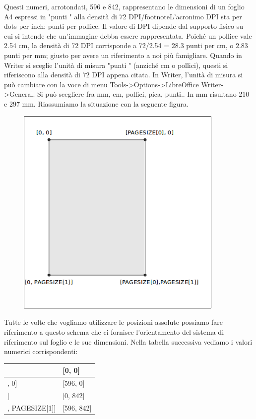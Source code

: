 Questi numeri, arrotondati, 596 e 842, rappresentano le dimensioni di un foglio A4 espressi in  "punti " alla densità di 72 DPI/footnote{L'acronimo DPI sta per dots per inch: punti per pollice. Il valore di DPI dipende dal supporto fisico su cui si intende che un'immagine debba essere rappresentata. Poiché un pollice vale 2.54 cm, la densità di 72 DPI corrisponde a 72/2.54 = 28.3 punti per cm, o 2.83 punti per mm; giusto per avere un riferimento a noi più famigliare. Quando in Writer si sceglie l'unità di misura  "punti " (anziché cm o pollici), questi si riferiscono alla densità di 72 DPI appena citata. In Writer, l'unità di misura si può cambiare con la voce di menu Tools->Options->LibreOffice Writer->General. Si può scegliere fra mm, cm, pollici, pica, punti.}. In mm risultano 210 e 297 mm. Riassumiamo la situazione con la seguente figura.

\vskip 1cm

\begin{figure}[H]
   \centering
   \includegraphics[width=10.0cm,trim=8 8 8 8,clip]{./images/disegnare/disegnare-30.png}
   \label{dis-30}
\end{figure}

\vskip 1cm

Tutte le volte che vogliamo utilizzare le posizioni assolute possiamo fare riferimento a questo schema che ci fornisce l'orientamento del sistema di riferimento sul foglio e le sue dimensioni. Nella tabella successiva vediamo i valori numerici corrispondenti:

\begin{center}
\begin{tabular}{| l | l |}
\hline
[0, 0] & [0, 0] \\ \hline
[PAGESIZE[0], 0]  & [596, 0] \\ \hline 
[0, PAGESIZE[1]]  &     [0, 842]   \\ \hline 
[PAGESIZE[0], PAGESIZE[1]]  & [596, 842]   \\ \hline 
\end{tabular}
\end{center}

